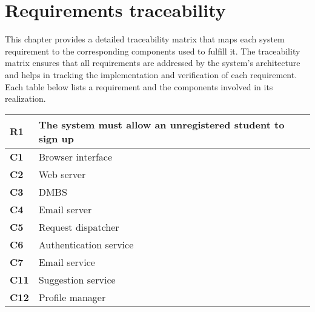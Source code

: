 \chapter{Requirements traceability}

This chapter provides a detailed traceability matrix that maps each system requirement to the corresponding components used to fulfill it. 
The traceability matrix ensures that all requirements are addressed by the system's architecture and helps in tracking the implementation and verification of each requirement. 
Each table below lists a requirement and the components involved in its realization.

\begin{table}[H]
    \centering
    \begin{tabular}{|l|m{10cm}|}
        \hline \textbf{R1} & The system must allow an unregistered student to sign up \\
        \hline \textbf{C1} & Browser interface \\
        \hline \textbf{C2} & Web server \\
        \hline \textbf{C3} & DMBS \\
        \hline \textbf{C4} & Email server \\
        \hline \textbf{C5} & Request dispatcher \\
        \hline \textbf{C6} & Authentication service \\
        \hline \textbf{C7} & Email service \\
        \hline \textbf{C11} & Suggestion service \\
        \hline \textbf{C12} & Profile manager \\
        \hline
    \end{tabular}
\end{table}

